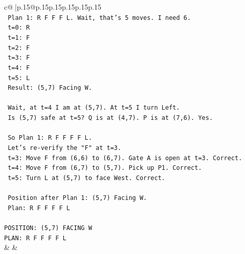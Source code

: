 \documentclass{article}
\begin{document}
{\begin{supertabular}{c@{$\;$}|p{.15\linewidth}@{}p{.15\linewidth}p{.15\linewidth}p{.15\linewidth}p{.15\linewidth}p{.15\linewidth}}
{{{\\ 
\texttt{  Plan 1: R F F F L. Wait, that's 5 moves. I need 6.} \\
\texttt{  t=0: R} \\
\texttt{  t=1: F} \\
\texttt{  t=2: F} \\
\texttt{  t=3: F} \\
\texttt{  t=4: F} \\
\texttt{  t=5: L} \\
\texttt{  Result: (5,7) Facing W.} \\
\\ 
\texttt{  Wait, at t=4 I am at (5,7). At t=5 I turn Left.} \\
\texttt{  Is (5,7) safe at t=5? Q is at (4,7). P is at (7,6). Yes.} \\
\\ 
\texttt{  So Plan 1: R F F F F L.} \\
\texttt{  Let's re{-}verify the "F" at t=3.} \\
\texttt{  t=3: Move F from (6,6) to (6,7). Gate A is open at t=3. Correct.} \\
\texttt{  t=4: Move F from (6,7) to (5,7). Pick up P1. Correct.} \\
\texttt{  t=5: Turn L at (5,7) to face West. Correct.} \\
\\ 
\texttt{  Position after Plan 1: (5,7) Facing W.} \\
\texttt{  Plan: R F F F F L} \\
\\ 
\texttt{POSITION: (5,7) FACING W} \\
\texttt{PLAN: R F F F F L} \\
            }
        }
    }
    & & \\ \\


\end{supertabular}}
\end{document}
